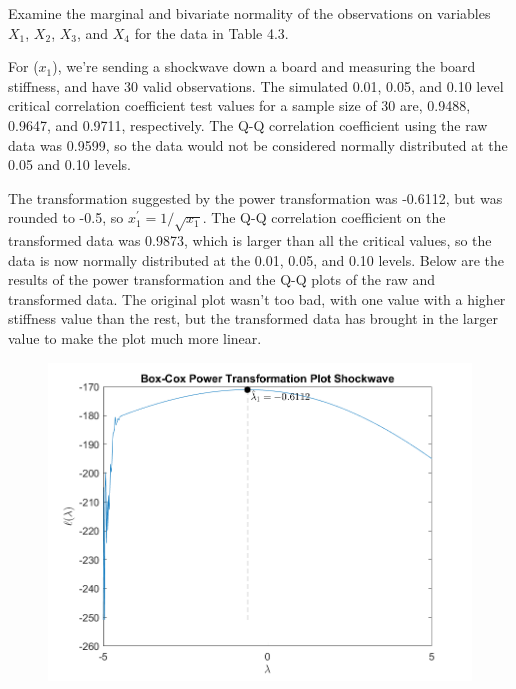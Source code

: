 Examine the marginal and bivariate normality of the observations on variables
$X_{1}$, $X_{2}$, $X_{3}$, and $X_{4}$ for the data in Table 4.3.

For ($x_{1}$), we're sending a shockwave down a board and measuring the board stiffness, and have 30 valid observations. The simulated 0.01, 0.05, and 0.10 level critical correlation coefficient test values for a sample size of 30 are, 0.9488, 0.9647, and 0.9711, respectively. The Q-Q correlation coefficient using the raw data was 0.9599, so the data would not be considered normally distributed at the 0.05 and 0.10 levels.

The transformation suggested by the power transformation was -0.6112, but was rounded to -0.5, so $x_{1}^{\prime} = 1/\sqrt{x_{1}}$. The Q-Q correlation coefficient on the transformed data was 0.9873, which is larger than all the critical values, so the data is now normally distributed at the 0.01, 0.05, and 0.10 levels. Below are the results of the power transformation and the Q-Q plots of the raw and transformed data. The original plot wasn't too bad, with one value with a higher stiffness value than the rest, but the transformed data has brought in the larger value to make the plot much more linear.

\begin{center}
    \begin{figure}[H]
        \centering
        \includegraphics[scale=0.6]{./matlab/chapter-4/sol4.33.power.1.png}
    \end{figure}
\end{center}

